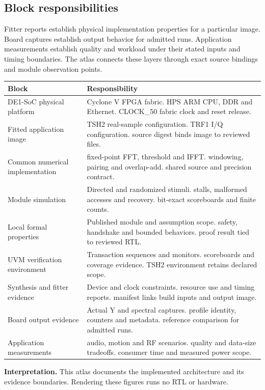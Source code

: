 \documentclass[11pt,letterpaper]{article}
\begin{document}
\subsection*{Block responsibilities}
Fitter reports establish physical implementation properties for a particular image. Board captures establish output behavior for admitted runs. Application measurements establish quality and workload under their stated inputs and timing boundaries. The atlas connects these layers through exact source bindings and module observation points.
\par\medskip\noindent
\begin{tabularx}{\linewidth}{@{}>{\raggedright\arraybackslash}p{1.65in}Y@{}}\toprule
\textbf{Block} & \textbf{Responsibility} \\ \midrule
DE1-SoC physical platform & Cyclone V FPGA fabric. HPS ARM CPU, DDR and Ethernet. CLOCK\_50 fabric clock and reset release. \\[5pt]
Fitted application image & TSH2 real-sample configuration. TRF1 I/Q configuration. source digest binds image to reviewed files. \\[5pt]
Common numerical implementation & fixed-point FFT, threshold and IFFT. windowing, pairing and overlap-add. shared source and precision contract. \\[5pt]
Module simulation & Directed and randomized stimuli. stalls, malformed accesses and recovery. bit-exact scoreboards and finite counts. \\[5pt]
Local formal properties & Published module and assumption scope. safety, handshake and bounded behaviors. proof result tied to reviewed RTL. \\[5pt]
UVM verification environment & Transaction sequences and monitors. scoreboards and coverage evidence. TSH2 environment retains declared scope. \\[5pt]
Synthesis and fitter evidence & Device and clock constraints. resource use and timing reports. manifest links build inputs and output image. \\[5pt]
Board output evidence & Actual Y and spectral captures. profile identity, counters and metadata. reference comparison for admitted runs. \\[5pt]
Application measurements & audio, motion and RF scenarios. quality and data-size tradeoffs. consumer time and measured power scope. \\[5pt]
\bottomrule\end{tabularx}
\vspace{8pt}
\noindent\textbf{Interpretation.} This atlas documents the implemented architecture and its evidence boundaries. Rendering these figures runs no RTL or hardware.
\clearpage
\end{document}
